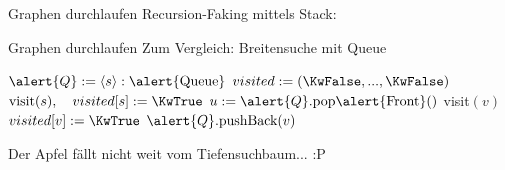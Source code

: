 \begin{frame}{Graphen durchlaufen}
	\solutionheading
	Recursion-Faking mittels Stack: 
	\begin{algorithm}[H]
	\end{algorithm}
	\vphantom{\impl Tp}
\end{frame}

\begin{frame}{Graphen durchlaufen}
	\solutionheading
	Zum Vergleich: Breitensuche mit Queue
	\begin{algorithm}[H]
		 {
			$\alert{Q} := \llist{s}: \alert{\|Queue|}$ \;
			$visited := (\KwFalse, ... , \KwFalse)$\;
			$\|visit|(s), \quad visited[s] := \KwTrue$ \;
			 {
				$u := \alert{Q}.\text{pop\alert{Front}}()$\;
				 {
					 {
						visit$(v)$  \;
						$visited[v] := \KwTrue$\;
						$\alert{Q}.\text{pushBack}(v)$\;
					}
				}
			}
		}
	\end{algorithm}
	\impl Der Apfel fällt nicht weit vom Tiefensuchbaum... :P
\end{frame}



